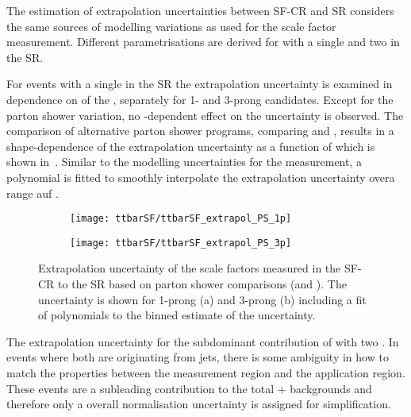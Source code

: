 The estimation of extrapolation uncertainties between SF-CR and
\hadhad SR considers the same sources of \ttbar modelling variations
as used for the scale factor measurement. Different parametrisations
are derived for \ttbar with a single \faketauhadvis and two
\faketauhadvis in the \hadhad SR.

For \ttbar events with a single \faketauhadvis in the \hadhad SR the
extrapolation uncertainty is examined in dependence on \pT of the
\faketauhadvis, separately for 1- and 3-prong candidates. Except for
the parton shower variation, no \pT-dependent effect on the
uncertainty is observed.  The comparison of alternative parton shower
programs, comparing \PYTHIA[8] and \HERWIG[7], results in a
shape-dependence of the extrapolation uncertainty as a function of
\tauhadvis \pT which is shown in~.
Similar to the modelling uncertainties for the measurement, a
polynomial is fitted to smoothly interpolate the extrapolation
uncertainty overa range auf \tauhadvis \pT. 

\begin{figure}[htbp]
  \centering

  \begin{subfigure}[t]{.495\textwidth}
    \texttt{[image: ttbarSF/ttbarSF\_extrapol\_PS\_1p]}
    \caption{}
    \label{fig:ttbarSF_extrapol_shape_a}
  \end{subfigure}\hfill%
  \begin{subfigure}[t]{.495\textwidth}
    \texttt{[image: ttbarSF/ttbarSF\_extrapol\_PS\_3p]}
    \caption{}
    \label{fig:ttbarSF_extrapol_shape_b}
  \end{subfigure}

  \caption{Extrapolation uncertainty of the scale factors measured in
    the SF-CR to the \hadhad SR based on parton shower comparisons
    (\PYTHIA[8] and \HERWIG[7]). The uncertainty is shown for 1-prong
    (a) and 3-prong \faketauhadvis (b) including a fit of polynomials
    to the binned estimate of the uncertainty. }
  \label{fig:ttbarSF_extrapol_shape}
\end{figure}

The extrapolation uncertainty for the subdominant contribution of
\ttbar with two \faketauhadvis.
In \ttbar events where both \tauhadvis are originating from jets,
there is some ambiguity in how to match the \tauhadvis properties
between the measurement region and the application region. These
events are a subleading contribution to the total \ttbar +
\faketauhadvis backgrounds and therefore only a overall normalisation
uncertainty is assigned for simplification.

